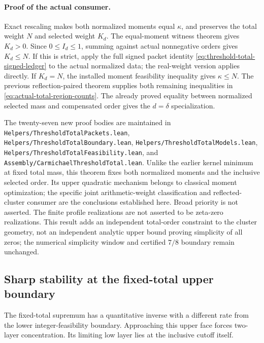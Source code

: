 \paragraph{Proof of the actual consumer.}
Exact rescaling makes both normalized moments equal \(\kappa\), and
preserves the total weight \(N\) and selected weight \(K_d\).
The equal-moment witness theorem gives \(K_d>0\).
Since \(0\le I_d\le1\), summing against actual nonnegative orders gives
\(K_d\le N\).  If this is strict, apply the full signed packet identity
\eqref{eq:threshold-total-signed-ledger} to the actual normalized data;
the real-weight version applies directly.  If \(K_d=N\), the installed
moment feasibility inequality gives \(\kappa\le N\).
The previous reflection-paired theorem supplies both remaining inequalities
in \eqref{eq:actual-total-region-counts}.  The already proved equality
between normalized selected mass and compensated order gives the
\(d=\delta\) specialization.

The twenty-seven new proof bodies are maintained in
\texttt{Helpers/ThresholdTotalPackets.lean},
\texttt{Helpers/ThresholdTotalBoundary.lean},
\texttt{Helpers/ThresholdTotalModels.lean},
\texttt{Helpers/ThresholdTotalFeasibility.lean}, and
\texttt{Assembly/CarmichaelThresholdTotal.lean}.
Unlike the earlier kernel minimum at fixed total mass, this theorem fixes
both normalized moments and the inclusive selected order.  Its upper
quadratic mechanism belongs to classical moment optimization; the specific
joint arithmetic-weight classification and reflected-cluster consumer are
the conclusions established here.  Broad priority is not asserted.
The finite profile realizations are not asserted to be zeta-zero
realizations.  This result adds an independent total-order constraint to
the cluster geometry, not an independent analytic upper bound proving
simplicity of all zeros; the numerical simplicity window and certified
\(7/8\) boundary remain unchanged.

\subsection{Sharp stability at the fixed-total upper boundary}
\label{subsec:threshold-total-stability}

The fixed-total supremum has a quantitative inverse with a different rate
from the lower integer-feasibility boundary.  Approaching this upper face
forces two-layer concentration.  Its limiting low layer lies at the
inclusive cutoff itself.

